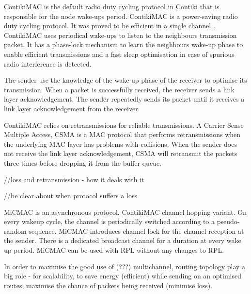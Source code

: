 ContikiMAC \cite{contikimac} is the default radio duty cycling protocol in Contiki that is responsible for the node wake-ups period. ContikiMAC is a power-saving radio duty cycling protocol. It was proved to be efficient in a single channel \cite{micmac}\cite{orpl}. ContikiMAC uses periodical wake-ups to listen to the neighbours transmission packet. It has a phase-lock mechanism to learn the neighbours wake-up phase to enable efficient transmissions and a fast sleep optimisation in case of spurious radio interference is detected.

The sender use the knowledge of the wake-up phase of the receiver to optimise its transmission. When a packet is successfully received, the receiver sends a link layer acknowledgement. The sender repeatedly sends its packet until it receives a link layer acknowledgement from the receiver. 

ContikiMAC relies on retransmissions for reliable transmissions. A Carrier Sense Multiple Access, CSMA is a MAC protocol that performs retransmissions when the underlying MAC layer has problems with collisions. When the sender does not receive the link layer acknowledgement, CSMA will retransmit the packets three times before dropping it from the buffer queue.


//loss and retransmission - how it deals with it

//be clear about when protocol suffers a loss

MiCMAC \cite{micmac} is an asynchronous protocol, ContikiMAC \cite{contikimac} channel hopping variant. On every wakeup cycle, the channel is periodically switched according to a pseudo-random sequence. MiCMAC introduces channel lock for the channel reception at the sender. There is a dedicated broadcast channel for a duration at every wake up period. MiCMAC can be used with RPL without any changes to RPL. %

In order to maximise the good use of (???) multichannel, routing topology play a big role - for scalability, to save energy (efficient) while sending on an optimised routes, maximise the chance of packets being received (minimise loss).

